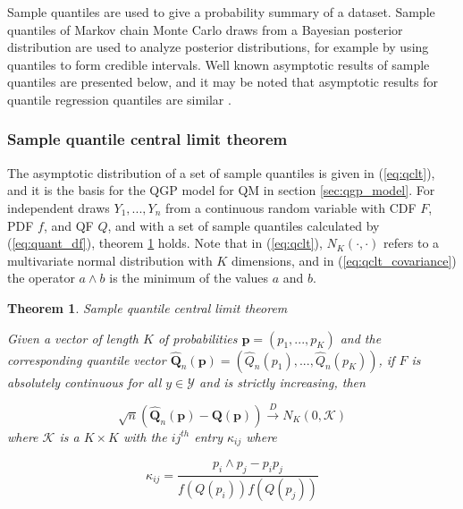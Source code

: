 \documentclass[preprint,12pt,authoryear]{elsarticle}
\newtheorem{theorem}{Theorem}
\newcommand{\1}[1]{\mathds{1}\left[#1\right]}
\begin{document}
Sample quantiles are used to give a probability summary of a dataset. Sample 
quantiles of Markov chain Monte Carlo draws from a Bayesian posterior 
distribution are used to analyze posterior distributions, for example by using 
quantiles to form credible intervals. 
Well known asymptotic results of sample quantiles are presented below, and it 
may be noted that asymptotic results for quantile regression quantiles are 
similar \cite[]{kocherginsky2005practical, koenker1978regression}. 

\subsubsection{Sample quantile central limit theorem} 

The asymptotic distribution of a set of sample quantiles is given in 
(\ref{eq:qclt}), and it is the basis for the QGP model for QM in section 
\ref{sec:qgp_model}. For independent draws $Y_1, ..., Y_n$ from a continuous 
random variable with CDF $F$, PDF $f$, and QF $Q$, and with a set of sample 
quantiles calculated by (\ref{eq:quant_df}), theorem \ref{thm:qclt} holds. 
Note that in (\ref{eq:qclt}), $N_K(\cdot, \cdot)$ refers to a multivariate 
normal distribution with $K$ dimensions, and in (\ref{eq:qclt_covariance}) the 
operator $a \wedge b$ is the minimum of the values $a$ and $b$.

\begin{theorem}{\emph{Sample quantile central limit theorem}}
\label{thm:qclt}

Given a vector of length $K$ of probabilities 
$\boldsymbol{p} = (p_1, ..., p_K)$ and the corresponding quantile vector 
$\hat{\boldsymbol{Q}}_n(\boldsymbol{p}) = (\hat{Q}_n(p_1), ..., \hat{Q}_n(p_K))$, 
if $F$ is absolutely continuous for all $y \in \mathcal{Y}$ and is strictly 
increasing, then

\begin{equation}
    \label{eq:qclt}
    \sqrt{n}(\hat{\boldsymbol{Q}}_n(\boldsymbol{p}) - 
    \boldsymbol{Q}(\boldsymbol{p})) \overset{D}{\rightarrow} 
    N_K(0, \boldsymbol{\mathcal{K}})
\end{equation}
where $\boldsymbol{\mathcal{K}}$ is a $K\times K$ with the $ij^{th}$ 
entry $\kappa_{ij}$ where

\begin{equation}
    \label{eq:qclt_covariance}
    \kappa_{ij} = \frac{p_i \wedge p_j - p_i p_j}{f(Q(p_i)) f(Q(p_j))}
\end{equation}
\end{theorem}
\end{document}
